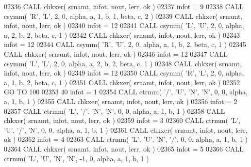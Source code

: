 \begin{DoxyCode}
02336       \textcolor{keyword}{CALL }chkxer( srnamt, infot, nout, lerr, ok )
02337       infot = 9
02338       \textcolor{keyword}{CALL }csymm( \textcolor{stringliteral}{'R'}, \textcolor{stringliteral}{'L'}, 2, 0, alpha, a, 1, b, 1, beta, c, 2 )
02339       \textcolor{keyword}{CALL }chkxer( srnamt, infot, nout, lerr, ok )
02340       infot = 12
02341       \textcolor{keyword}{CALL }csymm( \textcolor{stringliteral}{'L'}, \textcolor{stringliteral}{'U'}, 2, 0, alpha, a, 2, b, 2, beta, c, 1 )
02342       \textcolor{keyword}{CALL }chkxer( srnamt, infot, nout, lerr, ok )
02343       infot = 12
02344       \textcolor{keyword}{CALL }csymm( \textcolor{stringliteral}{'R'}, \textcolor{stringliteral}{'U'}, 2, 0, alpha, a, 1, b, 2, beta, c, 1 )
02345       \textcolor{keyword}{CALL }chkxer( srnamt, infot, nout, lerr, ok )
02346       infot = 12
02347       \textcolor{keyword}{CALL }csymm( \textcolor{stringliteral}{'L'}, \textcolor{stringliteral}{'L'}, 2, 0, alpha, a, 2, b, 2, beta, c, 1 )
02348       \textcolor{keyword}{CALL }chkxer( srnamt, infot, nout, lerr, ok )
02349       infot = 12
02350       \textcolor{keyword}{CALL }csymm( \textcolor{stringliteral}{'R'}, \textcolor{stringliteral}{'L'}, 2, 0, alpha, a, 1, b, 2, beta, c, 1 )
02351       \textcolor{keyword}{CALL }chkxer( srnamt, infot, nout, lerr, ok )
02352       \textcolor{keywordflow}{GO TO} 100
02353    40 infot = 1
02354       \textcolor{keyword}{CALL }ctrmm( \textcolor{stringliteral}{'/'}, \textcolor{stringliteral}{'U'}, \textcolor{stringliteral}{'N'}, \textcolor{stringliteral}{'N'}, 0, 0, alpha, a, 1, b, 1 )
02355       \textcolor{keyword}{CALL }chkxer( srnamt, infot, nout, lerr, ok )
02356       infot = 2
02357       \textcolor{keyword}{CALL }ctrmm( \textcolor{stringliteral}{'L'}, \textcolor{stringliteral}{'/'}, \textcolor{stringliteral}{'N'}, \textcolor{stringliteral}{'N'}, 0, 0, alpha, a, 1, b, 1 )
02358       \textcolor{keyword}{CALL }chkxer( srnamt, infot, nout, lerr, ok )
02359       infot = 3
02360       \textcolor{keyword}{CALL }ctrmm( \textcolor{stringliteral}{'L'}, \textcolor{stringliteral}{'U'}, \textcolor{stringliteral}{'/'}, \textcolor{stringliteral}{'N'}, 0, 0, alpha, a, 1, b, 1 )
02361       \textcolor{keyword}{CALL }chkxer( srnamt, infot, nout, lerr, ok )
02362       infot = 4
02363       \textcolor{keyword}{CALL }ctrmm( \textcolor{stringliteral}{'L'}, \textcolor{stringliteral}{'U'}, \textcolor{stringliteral}{'N'}, \textcolor{stringliteral}{'/'}, 0, 0, alpha, a, 1, b, 1 )
02364       \textcolor{keyword}{CALL }chkxer( srnamt, infot, nout, lerr, ok )
02365       infot = 5
02366       \textcolor{keyword}{CALL }ctrmm( \textcolor{stringliteral}{'L'}, \textcolor{stringliteral}{'U'}, \textcolor{stringliteral}{'N'}, \textcolor{stringliteral}{'N'}, -1, 0, alpha, a, 1, b, 1 )

\end{DoxyCode}
